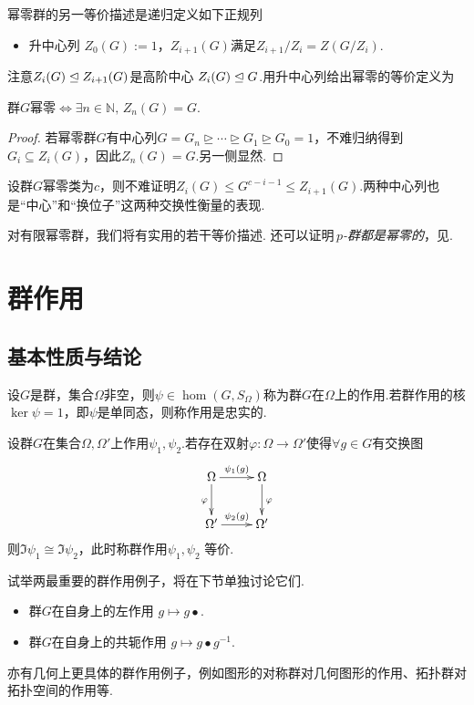 幂零群的另一等价描述是递归定义如下正规列
\begin{itemize}
	\item {\heiti 升中心列} $Z_0(G):=1$，$Z_{i+1}(G)$满足$Z_{i+1}/Z_i=Z(G/Z_i)$.
\end{itemize}
注意$Z_i(G)\trianglelefteq Z_{i+1}(G)$是{\heiti 高阶中心} $Z_i(G)\trianglelefteq G$.用升中心列给出幂零的等价定义为
\begin{prop}
	群$G$幂零$\iff\exists n\in\mathbb{N},\,Z_n(G)=G$.
\end{prop}
\begin{proof}
	若幂零群$G$有中心列$G=G_n\trianglerighteq\cdots\trianglerighteq G_1\trianglerighteq G_0=1$，不难归纳得到$G_i\subseteq Z_i(G)$，因此$Z_n(G)=G$.另一侧显然.
\end{proof}
\begin{remark}
	设群$G$幂零类为$c$，则不难证明$Z_i(G)\le G^{c-i-1}\le Z_{i+1}(G)$.两种中心列也是“中心”和“换位子”这两种交换性衡量的表现.
\end{remark}

对有限幂零群，我们将有实用的若干等价描述.%
还可以证明\,\emph{$p$-群都是幂零的}，见.%

\section{群作用}
\subsection{基本性质与结论}
\begin{definition}
	设$G$是群，集合$\Omega$非空，则$\psi\in\hom(G,S_\Omega)$称为{\heiti 群$G$在$\Omega$上的作用}.若群作用的核$\ker\psi=1$，即$\psi$是单同态，则称作用是{\heiti 忠实的}.

	设群$G$在集合$\Omega,\Omega'$上作用$\psi_1,\psi_2$.若存在双射$\varphi\colon\Omega\to\Omega'$使得$\forall g\in G$有交换图
	\[
		\xymatrix{
			\Omega\ar[r]^{\psi_1(g)}\ar[d]_\varphi&\Omega\ar[d]^\varphi\\
			\Omega'\ar[r]^{\psi_2(g)}&\Omega'
		}
	\]
	则$\Im\psi_1\cong\Im\psi_2$\footnotemark，此时称群作用$\psi_1,\psi_2$ {\heiti 等价}.
\end{definition}

试举两最重要的群作用例子，将在下节单独讨论它们.
\begin{itemize}
	\item 群$G$在自身上的{\heiti 左作用} $g\mapsto g\bullet$.
	\item 群$G$在自身上的{\heiti 共轭作用} $g\mapsto g\bullet g^{-1}$.
\end{itemize}
亦有几何上更具体的群作用例子，例如图形的对称群对几何图形的作用、拓扑群对拓扑空间的作用等.

